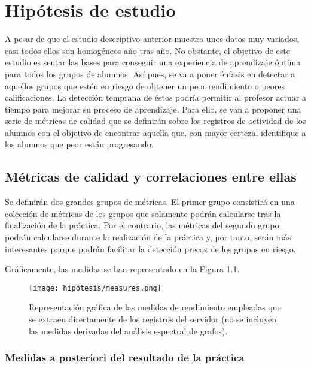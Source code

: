 \chapter{Hipótesis de estudio}\label{sec:chapterVII}

A pesar de que el estudio descriptivo anterior muestra unos datos muy variados, casi todos ellos son homogéneos año tras año. No obstante, el objetivo de este estudio es sentar las bases para conseguir una experiencia de aprendizaje óptima para todos los grupos de alumnos. Así pues, se va a poner énfasis en detectar a aquellos grupos que estén en riesgo de obtener un peor rendimiento o peores calificaciones. La detección temprana de éstos podría permitir al profesor actuar a tiempo para mejorar su proceso de aprendizaje. Para ello, se van a proponer una serie de métricas de calidad que se definirán sobre los registros de actividad de los alumnos con el objetivo de encontrar aquella que, con mayor certeza, identifique a los alumnos que peor están progresando.

\section{Métricas de calidad y correlaciones entre ellas}

Se definirán dos grandes grupos de métricas. El primer grupo consistirá en una colección de métricas de los grupos que solamente podrán calcularse tras la finalización de la práctica. Por el contrario, las métricas del segundo grupo podrán calcularse durante la realización de la práctica y, por tanto, serán más interesantes porque podrán facilitar la detección precoz de los grupos en riesgo.

Gráficamente, las medidas se han representado en la Figura \ref{fig:measures}.

\begin{figure}[H]
    \centering
    \texttt{[image: hipótesis/measures.png]}
    \caption{Representación gráfica de las medidas de rendimiento empleadas que se extraen directamente de los registros del servidor (no se incluyen las medidas derivadas del análisis espectral de grafos).}
    \label{fig:measures}
\end{figure}

\subsection{Medidas a posteriori del resultado de la práctica}

